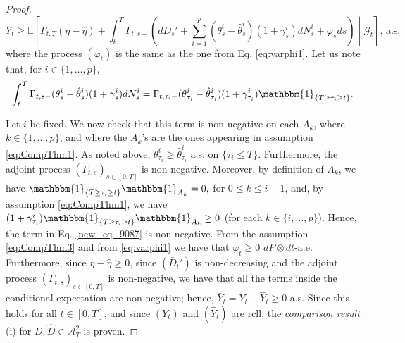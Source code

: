 \documentclass[11pt,a4paper]{article}
\numberwithin{equation}{section}
\theoremstyle{newPlain}
\theoremstyle{newDefinition}
\theoremstyle{newRemark}
\begin{document}
{\begin{proof}
\begin{equation}\label{eq:proofCompThm10}
    \bar{Y}_t \ge \mathbb{E}\left[\Gamma_{t,T}(\eta-\hat{\eta}) + \int_t^T\Gamma_{t,s-}\left(d\bar{D}_s'+\sum_{i=1}^p(\theta_s^i - \hat{\theta}_s^i)(1+\gamma_s^i)dN_s^i+\varphi_sds\right)\middle|\mathcal{G}_t\right]\text{,  a.s.}
\end{equation}
where the process $(\varphi_t)$ is the same as the one from Eq.  \eqref{eq:varphi1}.  Let us note that, for $i\in\{1,\ldots,p\}$, 
\begin{align}\label{new_eq_9087}
	\int_t^T\Gamma_{t,s-}(\theta_s^i-\hat{\theta}_s^i)(1+\gamma_s^i)dN_s^i = \Gamma_{t,\tau_i-}(\theta_{\tau_i}^i-\hat{\theta}_{\tau_i}^i)(1+\gamma_{\tau_i}^i)\mathbbm{1}_{\{T\ge\tau_i\ge t\}}.
\end{align}

Let $i$ be fixed. We now check that this term is non-negative on each $A_k$, where $k\in\{1,...,p\}$, and where the $A_k$'s are the ones appearing in  assumption \eqref{eq:CompThm1}.  	As noted above,  $\theta_{\tau_i}^i\ge\hat{\theta}_{\tau_i}^i$ a.s. on $\{\tau_i\le T\}$. Furthermore, the adjoint process  $(\Gamma_{t,s})_{s\in[0,T]}$ is non-negative.  Moreover, by definition of $A_k$, we have   $\mathbbm{1}_{\{T\ge\tau_i\ge t\}}\mathbbm{1}_{A_k}=0,$ for $ 0\leq k\leq i-1$, and,   by assumption  \eqref{eq:CompThm1}, we have $(1+\gamma^i_{\tau_i})\mathbbm{1}_{\{T\ge\tau_i\ge t\}}\mathbbm{1}_{A_k}\geq 0$ (for each $k\in\{i,...,p\}$). Hence, the term in Eq. \eqref{new_eq_9087} is non-negative. 
From the assumption \eqref{eq:CompThm3} and from  \eqref{eq:varphi1} we have that $\varphi_t\ge0$ $dP\otimes dt$-a.e. Furthermore, since $\eta-\hat{\eta}\ge0$, since $(\bar{D}_t')$ is non-decreasing and the adjoint process $(\Gamma_{t,s})_{s\in[0,T]}$ is non-negative, we have that all the terms inside the conditional expectation are non-negative; hence, $\bar{Y}_t = Y_t-\hat{Y}_t\ge0$ a.s. Since this holds for all $t\in[0,T]$, and since $(Y_t)$ and $(\hat Y_t)$ are rcll,  the \emph{comparison result} (i) for $D,\hat{D}\in\mathcal{A}_T^2$ is proven. 


\end{proof}}
\end{document}
